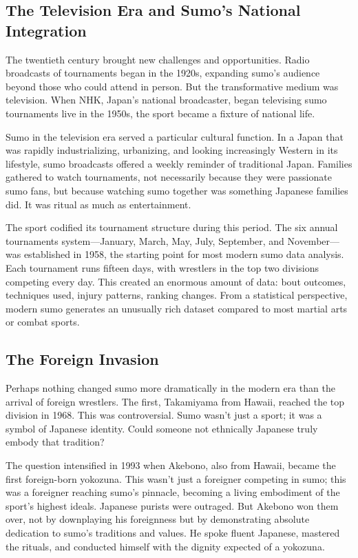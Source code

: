 \subsection{The Television Era and Sumo's National Integration}

The twentieth century brought new challenges and opportunities. Radio broadcasts of tournaments began in the 1920s, expanding sumo's audience beyond those who could attend in person. But the transformative medium was television. When NHK, Japan's national broadcaster, began televising sumo tournaments live in the 1950s, the sport became a fixture of national life.

Sumo in the television era served a particular cultural function. In a Japan that was rapidly industrializing, urbanizing, and looking increasingly Western in its lifestyle, sumo broadcasts offered a weekly reminder of traditional Japan. Families gathered to watch tournaments, not necessarily because they were passionate sumo fans, but because watching sumo together was something Japanese families did. It was ritual as much as entertainment.

The sport codified its tournament structure during this period. The six annual tournaments system—January, March, May, July, September, and November—was established in 1958, the starting point for most modern sumo data analysis. Each tournament runs fifteen days, with wrestlers in the top two divisions competing every day. This created an enormous amount of data: bout outcomes, techniques used, injury patterns, ranking changes. From a statistical perspective, modern sumo generates an unusually rich dataset compared to most martial arts or combat sports.

\subsection{The Foreign Invasion}

Perhaps nothing changed sumo more dramatically in the modern era than the arrival of foreign wrestlers. The first, Takamiyama from Hawaii, reached the top division in 1968. This was controversial. Sumo wasn't just a sport; it was a symbol of Japanese identity. Could someone not ethnically Japanese truly embody that tradition?

The question intensified in 1993 when Akebono, also from Hawaii, became the first foreign-born yokozuna. This wasn't just a foreigner competing in sumo; this was a foreigner reaching sumo's pinnacle, becoming a living embodiment of the sport's highest ideals. Japanese purists were outraged. But Akebono won them over, not by downplaying his foreignness but by demonstrating absolute dedication to sumo's traditions and values. He spoke fluent Japanese, mastered the rituals, and conducted himself with the dignity expected of a yokozuna.

